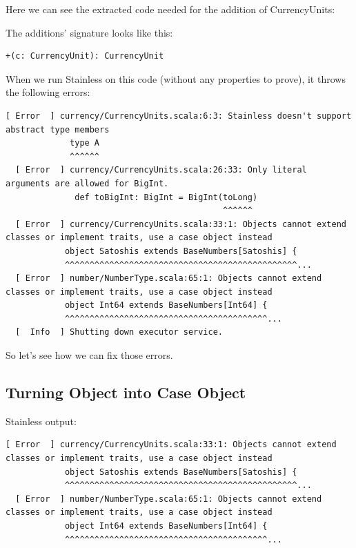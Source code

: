 \documentclass[runningheads]{llncs}
\begin{document}
Here we can see the extracted code needed for the addition of CurrencyUnits:



The additions' signature looks like this:
\begin{lstlisting}[style=scala]
  +(c: CurrencyUnit): CurrencyUnit
\end{lstlisting}

When we run Stainless on this code (without any properties to prove), it throws the following errors:

\begin{lstlisting}[style=stainless]
  [ Error  ] currency/CurrencyUnits.scala:6:3: Stainless doesn't support abstract type members
             type A
             ^^^^^^
  [ Error  ] currency/CurrencyUnits.scala:26:33: Only literal arguments are allowed for BigInt.
              def toBigInt: BigInt = BigInt(toLong)
                                            ^^^^^^
  [ Error  ] currency/CurrencyUnits.scala:33:1: Objects cannot extend classes or implement traits, use a case object instead
            object Satoshis extends BaseNumbers[Satoshis] {
            ^^^^^^^^^^^^^^^^^^^^^^^^^^^^^^^^^^^^^^^^^^^^^^^...
  [ Error  ] number/NumberType.scala:65:1: Objects cannot extend classes or implement traits, use a case object instead
            object Int64 extends BaseNumbers[Int64] {
            ^^^^^^^^^^^^^^^^^^^^^^^^^^^^^^^^^^^^^^^^^...
  [  Info  ] Shutting down executor service.
\end{lstlisting}

So let's see how we can fix those errors.


\subsection{Turning Object into Case Object}

Stainless output:
\begin{lstlisting}[style=stainless]
  [ Error  ] currency/CurrencyUnits.scala:33:1: Objects cannot extend classes or implement traits, use a case object instead
            object Satoshis extends BaseNumbers[Satoshis] {
            ^^^^^^^^^^^^^^^^^^^^^^^^^^^^^^^^^^^^^^^^^^^^^^^...
  [ Error  ] number/NumberType.scala:65:1: Objects cannot extend classes or implement traits, use a case object instead
            object Int64 extends BaseNumbers[Int64] {
            ^^^^^^^^^^^^^^^^^^^^^^^^^^^^^^^^^^^^^^^^^...
\end{lstlisting}
\end{document}
